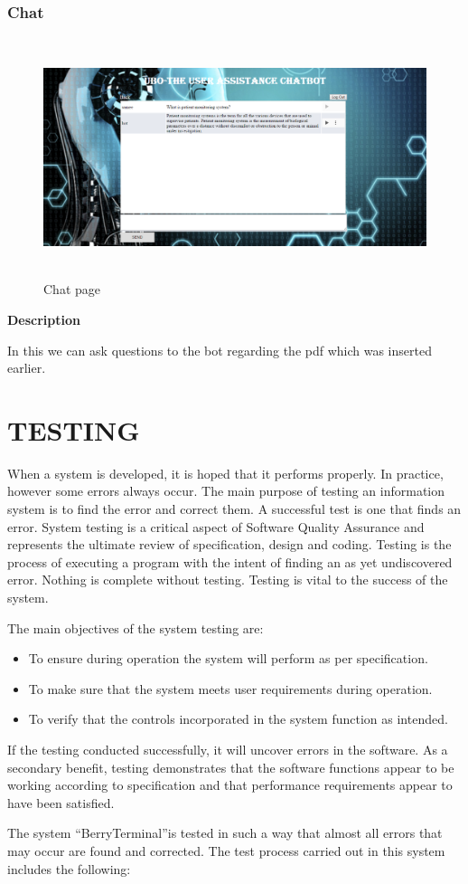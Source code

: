 \documentclass[12pt,a4paper,oneside]{report}
\newcommand{\quotes}[1]{``#1''}
\begin{document}
\newpage
\subsection{Chat}
\begin{figure}[h]
	\begin{center}
		\includegraphics[width=13cm,height=7cm]{chat.png}
			\caption{Chat page}
			\label{Chat page}
	\end{center}
\end{figure}
\textbf{Description}
\par In this we can ask questions to the bot regarding the pdf which was inserted earlier.


\chapter{TESTING}
\par When a system is developed, it is hoped that it performs properly. In practice, however some errors always occur. The main purpose of testing an information system is to find the error and correct them. A successful test is one that finds an error. System testing is a critical aspect of Software Quality Assurance and represents the ultimate review of speciﬁcation, design and coding. Testing is the process of executing a program with the intent of ﬁnding an as yet undiscovered error. Nothing is complete without testing. Testing is vital to the success of the system.
\par The main objectives of the system testing are:
\begin{itemize}
\item To ensure during operation the system will perform as per speciﬁcation.
\item To make sure that the system meets user requirements during operation.
\item To verify that the controls incorporated in the system function as intended.
 \end{itemize}
\par If the testing conducted successfully, it will uncover errors in the software. As a secondary benefit, testing demonstrates that the software functions appear to be working according to speciﬁcation and that performance requirements appear to have been satisfied.
\par The system \quotes{BerryTerminal}is tested in such a way that almost all errors that may occur are found and corrected. The test process carried out in this system includes the following:
\end{document}
